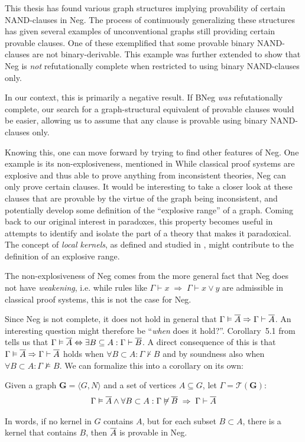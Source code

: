 This thesis has found various graph structures implying provability of certain NAND-clauses in Neg.
The process of continuously generalizing these structures has given several examples of unconventional graphs still providing certain provable clauses.
One of these exemplified that some provable binary NAND-clauses are not binary-derivable.
This example was further extended to show that Neg is \textit{not} refutationally complete when restricted to using binary NAND-clauses only.

In our context, this is primarily a negative result.
If BNeg \textit{was} refutationally complete, our search for a graph-structural equivalent of provable clauses would be easier, allowing us to assume that any clause is provable using binary NAND-clauses only.

Knowing this, one can move forward by trying to find other features of Neg.
One example is its non-explosiveness, mentioned in \cite{michal-completeness}
While classical proof systems are explosive and thus able to prove anything from inconsistent theories, Neg can only prove certain clauses.
It would be interesting to take a closer look at these clauses that are provable by the virtue of the graph being inconsistent, and potentially develop some definition of the ``explosive range'' of a graph.
Coming back to our original interest in paradoxes, this property becomes useful in attempts to identify and isolate the part of a theory that makes it paradoxical.
The concept of \textit{local kernels}, as defined and studied in \cite{synthese-pdl}, might contribute to the definition of an explosive range.

The non-explosiveness of Neg comes from the more general fact that Neg does not have \textit{weakening}, i.e. while rules like $\Gamma \vdash x \; \Rightarrow \; \Gamma \vdash x \vee y$ are admissible in classical proof systems, this is not the case for Neg.

Since Neg is not complete, it does not hold in general that $\Gamma \vDash \ol{A} \Rightarrow \Gamma \vdash \ol{A}$.
An interesting question might therefore be ``\textit{when} does it hold?''.
Corollary~5.1 from \cite{michal-completeness} tells us that $\Gamma \vDash \ol{A} \Leftrightarrow \exists B \subseteq A: \Gamma \vdash \ol{B}$.
A direct consequence of this is that $\Gamma \vDash \ol{A} \Rightarrow \Gamma \vdash \ol{A}$ holds when $\forall B \subset A: \Gamma \not\vdash B$ and by soundness also when $\forall B \subset A: \Gamma \not\vDash B$.
We can formalize this into a corollary on its own:
\begin{corollary}
  Given a graph $\mathbf{G} = \langle G,N \rangle$ and a set of vertices $A \subseteq G$, let $\Gamma = \mathcal{T}(\mathbf{G})$:
  \begin{align}
    \Gamma \vDash \ol{A} \wedge \forall B \subset A: \Gamma \not\vDash \ol{ B } \;\Rightarrow \; \Gamma \vdash \ol{A}
  \end{align}
\end{corollary}
In words, if no kernel in $G$ contains $A$, but for each subset $B \subset A$, there is a kernel that contains $B$, then $\ol{A}$ is provable in Neg.

